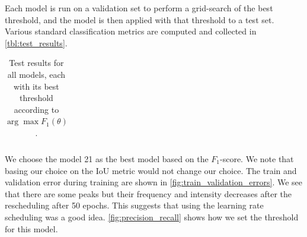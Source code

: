 \documentclass[10pt,conference]{IEEEtran}
\begin{document}
Each model is run on a validation set to perform a grid-search of the best threshold,
and the model is then applied with that threshold to a test set.
Various standard classification metrics are computed and collected in \autoref{tbl:test_results}.

\begin{table}
    \begin{center}
        \begin{tabular}{||c | c c c c||}
             \hline
             
        \end{tabular}
    \end{center}
    \caption{Test results for all models, each with its best threshold according to $\arg\max F_1(\theta)$.
    }
    \label{tbl:test_results}
\end{table}

We choose the model 21 as the best model based on the $F_1$-score. We note that basing our choice on the IoU metric would not change our choice.
The train and validation error during training are shown in \autoref{fig:train_validation_errors}.
We see that there are some peaks but their frequency and intensity decreases after the rescheduling after 50 epochs. This suggests that using the learning rate scheduling was a good idea. \autoref{fig:precision_recall} shows how we set the threshold for this model.
\end{document}
